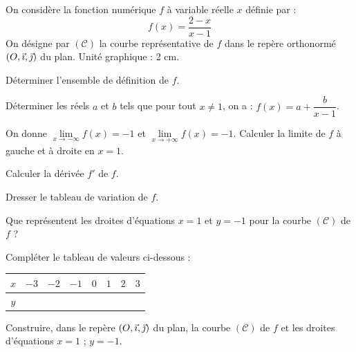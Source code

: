 \documentclass[11pt]{article}
\begin{document}
On considère la fonction numérique $f$ à variable réelle $x$ définie par :
\[ f(x) = \frac{2 - x}{x - 1} \]
On désigne par $(\mathcal{C})$ la courbe représentative de $f$ dans le repère orthonormé $(O,\vec{\imath},\vec{\jmath})$ du plan. Unité graphique : 2 cm.
\begin{questions}
  \item Déterminer l'ensemble de définition de $f$.
  \item Déterminer les réels $a$ et $b$ tels que pour tout $x \ne 1$, on a : $f(x) = a + \dfrac{b}{x - 1}$.
  \item On donne $\lim\limits_{x\to-\infty} f(x) = -1$ et $\lim\limits_{x\to+\infty} f(x) = -1$. Calculer la limite de $f$ à gauche et à droite en $x = 1$.
  \item \begin{sousq}
    \item Calculer la dérivée $f'$ de $f$.
    \item Dresser le tableau de variation de $f$.
    \item Que représentent les droites d'équations $x = 1$ et $y = -1$ pour la courbe $(\mathcal{C})$ de $f$ ?
  \end{sousq}
  \item \begin{sousq}
    \item Compléter le tableau de valeurs ci-dessous :
    \begin{center}\renewcommand{\arraystretch}{1.5}
    \begin{tabular}{|c|c|c|c|c|c|c|c|}
    \hline
    $x$ & $-3$ & $-2$ & $-1$ & $0$ & $1$ & $2$ & $3$ \\
    \hline
    $y$ & & & & & & & \\
    \hline
    \end{tabular}
    \end{center}
    \item Construire, dans le repère $(O,\vec{\imath},\vec{\jmath})$ du plan, la courbe $(\mathcal{C})$ de $f$ et les droites d'équations $x = 1$ ; $y = -1$.
  \end{sousq}
\end{questions}
\end{document}
